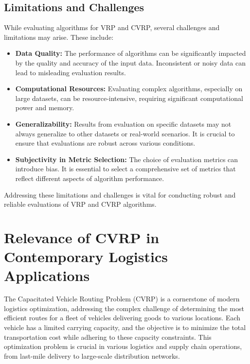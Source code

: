 \documentclass[
]{article}
\begin{document}
    \subsection{Limitations and Challenges}\label{subsec:limitations-and-challenges}
    While evaluating algorithms for VRP and CVRP, several challenges and limitations may arise. These include:
    \begin{itemize}
        \item \textbf{Data Quality:} The performance of algorithms can be significantly impacted by the quality and accuracy of the input data. Inconsistent or noisy data can lead to misleading evaluation results.
        \item \textbf{Computational Resources:} Evaluating complex algorithms, especially on large datasets, can be resource-intensive, requiring significant computational power and memory.
        \item \textbf{Generalizability:} Results from evaluation on specific datasets may not always generalize to other datasets or real-world scenarios. It is crucial to ensure that evaluations are robust across various conditions.
        \item \textbf{Subjectivity in Metric Selection:} The choice of evaluation metrics can introduce bias. It is essential to select a comprehensive set of metrics that reflect different aspects of algorithm performance.
    \end{itemize}
    Addressing these limitations and challenges is vital for conducting robust and reliable evaluations of VRP and CVRP algorithms.

    \newpage


    \section{Relevance of CVRP in Contemporary Logistics Applications}\label{sec:relevance-of-cvrp-in-contemporary-logistics-applications}

    The Capacitated Vehicle Routing Problem (CVRP) is a cornerstone of modern logistics optimization, addressing the complex challenge of determining the most efficient routes for a fleet of vehicles delivering goods to various locations. Each vehicle has a limited carrying capacity, and the objective is to minimize the total transportation cost while adhering to these capacity constraints. This optimization problem is crucial in various logistics and supply chain operations, from last-mile delivery to large-scale distribution networks.
\end{document}
